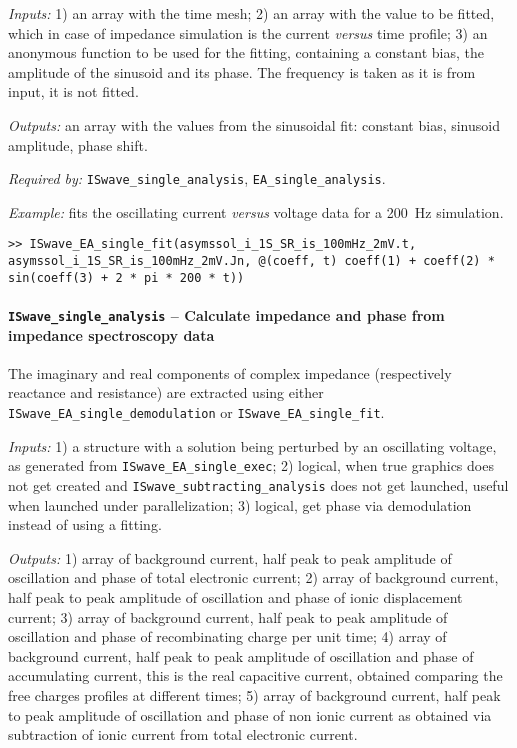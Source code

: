 	\textit{Inputs:} 1) an array with the time mesh;
	2) an array with the value to be fitted, which in case of impedance simulation is the current \textsl{versus} time profile;
	3) an anonymous function to be used for the fitting, containing
	a constant bias, the amplitude of the sinusoid and its phase. The
	frequency is taken as it is from input, it is not fitted.

	\textit{Outputs:} an array with the values from the sinusoidal fit: constant
	bias, sinusoid amplitude, phase shift.


	\textit{Required by:} \texttt{ISwave\_single\_analysis}, \texttt{EA\_single\_analysis}.

	\textit{Example:} fits the oscillating current \textsl{versus} voltage data for a \SI{200}{\Hz} simulation.
	\begin{lstlisting}[style=Matlab-editor]
>> ISwave_EA_single_fit(asymssol_i_1S_SR_is_100mHz_2mV.t, asymssol_i_1S_SR_is_100mHz_2mV.Jn, @(coeff, t) coeff(1) + coeff(2) * sin(coeff(3) + 2 * pi * 200 * t))
\end{lstlisting}



	\paragraph{\texttt{ISwave\_single\_analysis} -- Calculate impedance and phase from impedance spectroscopy data}
	The imaginary and real components of complex impedance (respectively reactance and resistance) are extracted using either \texttt{ISwave\_EA\_single\_demodulation} or \texttt{ISwave\_EA\_single\_fit}.

	\textit{Inputs:} 1) a structure with a solution being perturbed by an
	oscillating voltage, as generated from \texttt{ISwave\_EA\_single\_exec};
	2) logical, when true graphics does not get created and
	\texttt{ISwave\_subtracting\_analysis} does not get launched, useful when
	launched under parallelization;
	3) logical, get phase via demodulation instead of using a fitting.

	\textit{Outputs:} 1) array of background current, half peak to peak amplitude of
	oscillation and phase of total electronic current;
	2) array of background current, half peak to peak amplitude of
	oscillation and phase of ionic displacement current;
	3) array of background current, half peak to peak amplitude of
	oscillation and phase of recombinating charge per unit time;
	4) array of background current, half peak to peak amplitude of
	oscillation and phase of accumulating current, this is the real
	capacitive current, obtained comparing the free charges profiles at
	different times;
	5) array of background current, half peak to peak amplitude of
	oscillation and phase of non ionic current as obtained via
	subtraction of ionic current from total electronic current.

